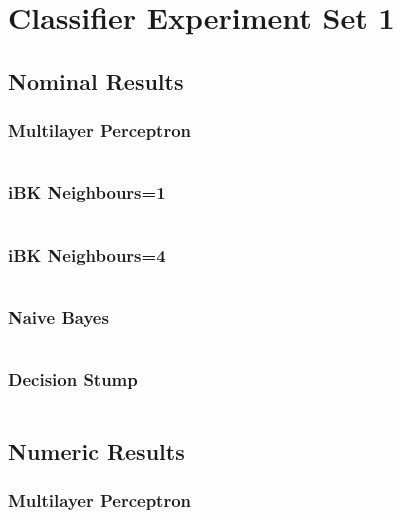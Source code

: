 \section{Classifier Experiment Set 1}
\label{sec:results:cexp1}
\subsection{Nominal Results}
\subsubsection{Multilayer Perceptron}
\inputminted[fontsize=\footnotesize,breaklines=true]{text}{../data/processed/third/nominal-multilayer-perceptron.txt}
\clearpage

\subsubsection{iBK Neighbours=1}
\inputminted[fontsize=\footnotesize,breaklines=true]{text}{../data/processed/third/nominal-ibk-1.txt}
\clearpage

\subsubsection{iBK Neighbours=4}
\inputminted[fontsize=\footnotesize,breaklines=true]{text}{../data/processed/third/nominal-ibk-4.txt}
\clearpage

\subsubsection{Naive Bayes}
\inputminted[fontsize=\footnotesize,breaklines=true]{text}{../data/processed/third/nominal-naive-bayes.txt}
\clearpage

\subsubsection{Decision Stump}
\inputminted[fontsize=\footnotesize,breaklines=true]{text}{../data/processed/third/nominal-decision-stump.txt}
\clearpage

\subsection{Numeric Results}
\subsubsection{Multilayer Perceptron}
\inputminted[fontsize=\footnotesize,breaklines=true]{text}{../data/processed/third/numeric-multilayer-perceptron.txt}
\clearpage

